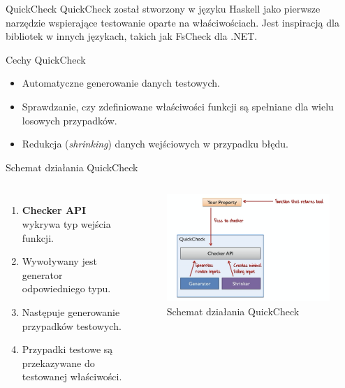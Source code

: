 \begin{frame}{QuickCheck}
    QuickCheck został stworzony w języku Haskell jako pierwsze narzędzie wspierające testowanie oparte na właściwościach.
    Jest inspiracją dla bibliotek w innych językach, takich jak FsCheck dla .NET.
    \end{frame}
    
    \begin{frame}{Cechy QuickCheck}
    \begin{itemize}
        \item Automatyczne generowanie danych testowych.
        \item Sprawdzanie, czy zdefiniowane właściwości funkcji są spełniane dla wielu losowych przypadków.
        \item Redukcja (\textit{shrinking}) danych wejściowych w przypadku błędu.
    \end{itemize}
    \end{frame}
    
    \begin{frame}{Schemat działania QuickCheck}
        \begin{columns}[t]
                \begin{enumerate}
                    \item \textbf{Checker API} wykrywa typ wejścia funkcji.
                    \item Wywoływany jest generator odpowiedniego typu.
                    \item Następuje generowanie przypadków testowych.
                    \item Przypadki testowe są przekazywane do testowanej właściwości.
                \end{enumerate}
            \centering
            \begin{figure}[h]
                \centering
                \includegraphics[width=1\textwidth]{images/schema.png}
                \caption{Schemat działania QuickCheck}
            \end{figure}    
        \end{columns}
    \end{frame}
    
